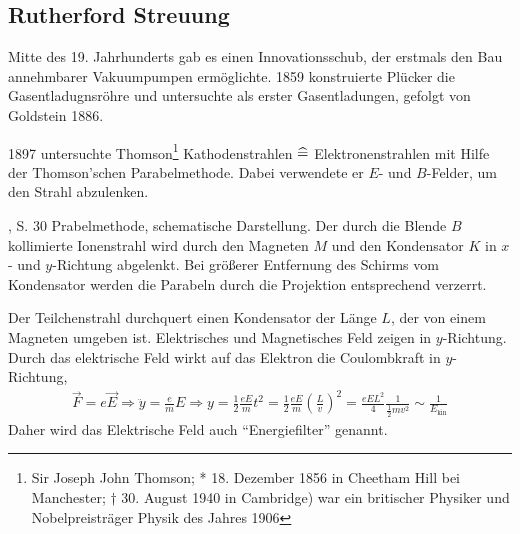 \subsection{Rutherford Streuung}
Mitte des 19. Jahrhunderts gab es einen Innovationsschub, der erstmals den
Bau annehmbarer Vakuumpumpen ermöglichte. 1859 konstruierte Plücker die
Gasentladugnsröhre und untersuchte als erster Gasentladungen, gefolgt von
Goldstein 1886.

1897 untersuchte Thomson\footnote{Sir Joseph John Thomson; * 18. Dezember 1856
in Cheetham Hill bei Manchester; † 30. August 1940 in Cambridge) war ein
britischer Physiker und Nobelpreisträger Physik des Jahres 1906}
Kathodenstrahlen $\mathrel{\widehat{=}}$ Elektronenstrahlen mit Hilfe der Thomson'schen
Parabelmethode. Dabei verwendete er $E$- und $B$-Felder, um den Strahl
abzulenken.

%
	{\HakenWolf, S. 30}%
	{Prabelmethode, schematische Darstellung. Der durch die Blende $B$
kollimierte Ionenstrahl wird durch den Magneten $M$ und den Kondensator $K$ in
$x$- und $y$-Richtung abgelenkt. Bei größerer Entfernung des Schirms vom
Kondensator werden die Parabeln durch die Projektion entsprechend verzerrt.}
% 
% 

Der Teilchenstrahl durchquert einen Kondensator der Länge $L$, der von einem
Magneten umgeben ist. Elektrisches und Magnetisches Feld zeigen in
$y$-Richtung. Durch das elektrische Feld wirkt auf das Elektron die
Coulombkraft in $y$-Richtung,
\begin{align*}
\vec{F} = e\vec{E} \Rightarrow \ddot{y} = \frac{e}{m}E \Rightarrow y =
\frac{1}{2}\frac{eE}{m}t^2 = \frac{1}{2}\frac{eE}{m}\left(\frac{L}{v}\right)^2
= \frac{eEL^2}{4}\frac{1}{\frac{1}{2}mv^2}\sim \frac{1}{E_{\text{kin}}}\tag{*}
\end{align*}
Daher wird das Elektrische Feld auch ``Energiefilter'' genannt.

